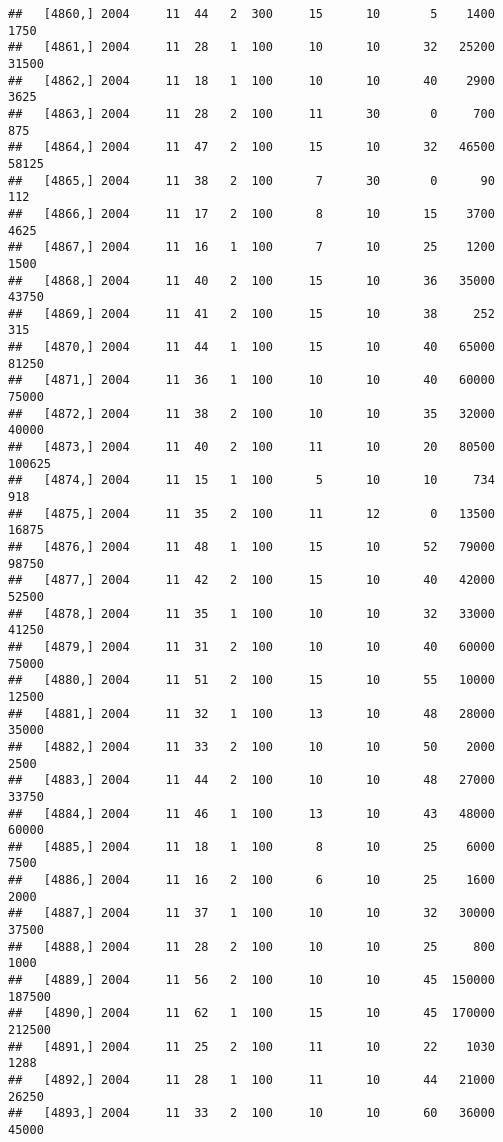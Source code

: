 \documentclass{article}\usepackage[]{graphicx}\usepackage[]{color}
\makeatletter
\newenvironment{kframe}{%
 \def\at@end@of@kframe{}%
 \ifinner\ifhmode%
  \def\at@end@of@kframe{\end{minipage}}%
  \begin{minipage}{\columnwidth}%
 \fi\fi%
 \def\FrameCommand##1{\hskip\@totalleftmargin \hskip-\fboxsep
 \colorbox{shadecolor}{##1}\hskip-\fboxsep
     \hskip-\linewidth \hskip-\@totalleftmargin \hskip\columnwidth}%
 \MakeFramed {\advance\hsize-\width
   \@totalleftmargin\z@ \linewidth\hsize
   \@setminipage}}%
 {\par\unskip\endMakeFramed%
 \at@end@of@kframe}
\newenvironment{knitrout}{}{} %
\makeatother
\begin{document}
\begin{knitrout}
\begin{kframe}
\begin{verbatim}
##   [4860,] 2004     11  44   2  300     15      10       5    1400    1750
##   [4861,] 2004     11  28   1  100     10      10      32   25200   31500
##   [4862,] 2004     11  18   1  100     10      10      40    2900    3625
##   [4863,] 2004     11  28   2  100     11      30       0     700     875
##   [4864,] 2004     11  47   2  100     15      10      32   46500   58125
##   [4865,] 2004     11  38   2  100      7      30       0      90     112
##   [4866,] 2004     11  17   2  100      8      10      15    3700    4625
##   [4867,] 2004     11  16   1  100      7      10      25    1200    1500
##   [4868,] 2004     11  40   2  100     15      10      36   35000   43750
##   [4869,] 2004     11  41   2  100     15      10      38     252     315
##   [4870,] 2004     11  44   1  100     15      10      40   65000   81250
##   [4871,] 2004     11  36   1  100     10      10      40   60000   75000
##   [4872,] 2004     11  38   2  100     10      10      35   32000   40000
##   [4873,] 2004     11  40   2  100     11      10      20   80500  100625
##   [4874,] 2004     11  15   1  100      5      10      10     734     918
##   [4875,] 2004     11  35   2  100     11      12       0   13500   16875
##   [4876,] 2004     11  48   1  100     15      10      52   79000   98750
##   [4877,] 2004     11  42   2  100     15      10      40   42000   52500
##   [4878,] 2004     11  35   1  100     10      10      32   33000   41250
##   [4879,] 2004     11  31   2  100     10      10      40   60000   75000
##   [4880,] 2004     11  51   2  100     15      10      55   10000   12500
##   [4881,] 2004     11  32   1  100     13      10      48   28000   35000
##   [4882,] 2004     11  33   2  100     10      10      50    2000    2500
##   [4883,] 2004     11  44   2  100     10      10      48   27000   33750
##   [4884,] 2004     11  46   1  100     13      10      43   48000   60000
##   [4885,] 2004     11  18   1  100      8      10      25    6000    7500
##   [4886,] 2004     11  16   2  100      6      10      25    1600    2000
##   [4887,] 2004     11  37   1  100     10      10      32   30000   37500
##   [4888,] 2004     11  28   2  100     10      10      25     800    1000
##   [4889,] 2004     11  56   2  100     10      10      45  150000  187500
##   [4890,] 2004     11  62   1  100     15      10      45  170000  212500
##   [4891,] 2004     11  25   2  100     11      10      22    1030    1288
##   [4892,] 2004     11  28   1  100     11      10      44   21000   26250
##   [4893,] 2004     11  33   2  100     10      10      60   36000   45000

\end{verbatim}
\end{kframe}
\end{knitrout}
\end{document}
